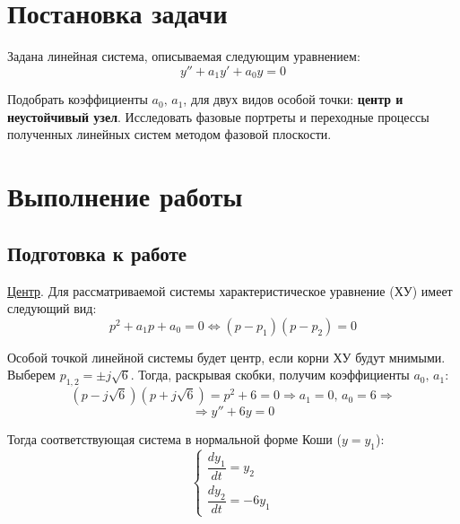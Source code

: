 


	
	
	\setcounter{page}{2}
	\tableofcontents
	\newpage
	
	\section{Постановка задачи}
	
	Задана линейная система, описываемая следующим уравнением:
	\begin{equation*}
		y''+a_1y'+a_0y = 0
	\end{equation*}
	
	Подобрать коэффициенты $a_0,\,a_1$, для двух видов особой точки: \textbf{центр и неустойчивый узел}. Исследовать фазовые портреты и переходные процессы полученных линейных систем методом фазовой плоскости. 
	
	\section{Выполнение работы}
	\subsection{Подготовка к работе}
	
	\underline{Центр}. Для рассматриваемой системы характеристическое уравнение (ХУ) имеет следующий вид:
	\begin{equation*}
		p^2 + a_1p + a_0 = 0 \Leftrightarrow (p-p_1)(p-p_2) = 0
	\end{equation*}

	Особой точкой линейной системы будет центр, если корни ХУ будут мнимыми. Выберем $p_{1,2} = \pm j\sqrt{6}$. Тогда, раскрывая скобки, получим коэффициенты $a_0,\,a_1$:
	\begin{equation*}
		(p-j\sqrt{6})(p+j\sqrt{6}) = p^2 + 6 = 0 \Rightarrow a_1 = 0,\, a_0 = 6 \Rightarrow
	\end{equation*}
	\begin{equation*}
		\Rightarrow y'' + 6y = 0
	\end{equation*}

	Тогда соответствующая система в нормальной форме Коши ($y=y_1$):
	\begin{equation}
		\begin{cases*}
			\dfrac{dy_1}{dt} = y_2 \\[0.5em] 
			\dfrac{dy_2}{dt} = -6y_1
		\end{cases*}
		\label{center}
	\end{equation}

